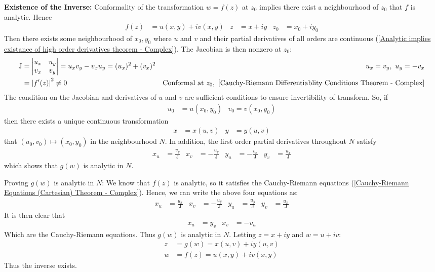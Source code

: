 \documentclass[12pt, english]{book}
\makeatletter
\renewenvironment{proof}[1][\proofname]{\par
	\pushQED{\qed}%
	\normalfont \topsep6\p@\@plus6\p@\relax
	\list{}{%
		\settowidth{\leftmargin}{\itshape\proofname:\hskip\labelsep}%
		\setlength{\labelwidth}{0pt}%
		\setlength{\itemindent}{-\leftmargin}%
		}%
	\item[\hskip\labelsep\itshape#1\@addpunct{:}]\ignorespaces
	}{\popQED\endlist\@endpefalse}
\makeatother
\begin{document}
	\textbf{Existence of the Inverse:} \newline
	Conformality of the transformation \(w = f(z)\) at \(z_0\) implies there exist a neighbourhood of \(z_0\) that \(f\) is analytic. Hence
	\begin{align*}
		f(z) &= u(x,y) + iv(x,y) &
		z &= x + iy &
		z_0 &= x_0 + iy_0
	\end{align*}
	Then there exists some neighbourhood of \(x_0, y_0\) where \(u\) and \(v\) and their partial derivatives of all orders are continuous (\cref{Analytic implies existance of high order derivatives theorem - Complex}). The Jacobian is then nonzero at \(z_0\):
	\begin{align*}
		\operatorname{J} 
		&= \mdet{u_x & u_y \\ v_x & v_y} = u_x v_y - v_x u_y 
	 	 = (u_x)^2 + (v_x)^2 & u_x = v_y, \ u_y = -v_x \\
		&= \abs{f'(z)}^2 \neq 0 
			& \text{Conformal at } z_0, \ \text{\Cref{Cauchy-Riemann Differentiablity Conditions Theorem - Complex}}
	\end{align*}
	The condition on the Jacobian and derivatives of \(u\) and \(v\) are sufficient conditions to ensure invertibility of transform. So, if 
	\begin{align*}
		u_0 &= u(x_0, y_0) & v_0 = v(x_0, y_0)
	\end{align*}
	then there exists a unique continuous transformation
	\begin{align*}
		x &= x(u,v) & y &= y(u,v)
	\end{align*}
	that \((u_0, v_0) \mapsto (x_0, y_0)\) in the neighbourhood \(N\). In addition, the first order partial derivatives throughout \(N\) satisfy
	\begin{align*}
		x_u &= \frac{v_y}{\operatorname{J}} &
		x_v &= -\frac{u_y}{\operatorname{J}} &
		y_u &= - \frac{v_x}{\operatorname{J}} &
		y_v &= \frac{u_x}{\operatorname{J}}
	\end{align*}
	which shows that \(g(w)\) is analytic in \(N\).
	\begin{proof}
		{\color{Grey}
		Proving \(g(w)\) is analytic in \(N\):\newline
		We know that \(f(z)\) is analytic, so it satisfies the Cauchy-Riemann equations (\cref{Cauchy-Riemann Equations (Cartesian) Theorem - Complex}). Hence, we can write the above four equations as:
		\begin{align*}
			x_u &= \frac{u_x}{\operatorname{J}} &
			x_v &= -\frac{u_y}{\operatorname{J}} &
			y_u &= \frac{u_y}{\operatorname{J}} &
			y_v &= \frac{u_x}{\operatorname{J}}
		\end{align*}
		It is then clear that 
		\begin{align*}
			x_u &= y_v & x_v &= -v_u
		\end{align*}
		Which are the Cauchy-Riemann equations. Thus \(g(w)\) is analytic in \(N\).
		}
	\end{proof}
	Letting \(z = x + iy\) and \(w = u + iv\):
	\begin{align*}
		z &= g(w) = x(u, v) + iy(u,v) \\
		w &= f(z) = u(x, y) + iv(x,y)
	\end{align*}
	Thus the inverse exists.
	
\end{document}

